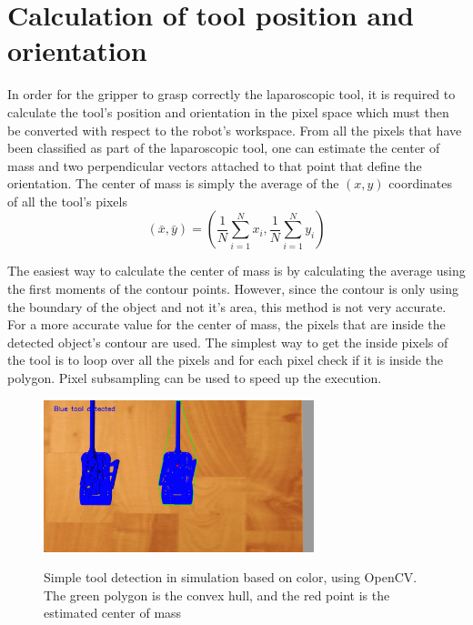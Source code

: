 \section{Calculation of tool position and orientation}

In order for the gripper to grasp correctly the laparoscopic tool, it is required to calculate the tool's position and orientation in the pixel space 
which must then be converted with respect to the robot's workspace. From all the pixels that have been classified as part of the laparoscopic tool,  one can estimate the center of mass and two perpendicular vectors attached to that point that define the orientation. The center of mass is simply the average of the $(x,y)$ coordinates of all the tool's pixels
\begin{equation}
\left( \bar{x}, \bar{y} \right) = \left( \frac{1}{N}\sum_{i=1}^{N} x_i , \frac{1}{N}\sum_{i=1}^{N} y_i \right)
\end{equation}

The easiest way to calculate the center of mass is by calculating the average using the first moments of the contour points. However, since the contour is only using the boundary of the object and not it's area, this method is not very accurate. For a more accurate value for the center of mass, the pixels that are inside the detected object's contour are used. The simplest way to get the inside pixels of the tool is to loop over all the pixels and for each pixel check if it is inside the polygon. Pixel subsampling can be used to speed up the execution.

\begin{center}
\begin{figure}[htbp]
\centering
\includegraphics[width=0.7\textwidth]{images/opencv-tool-convex-hull.png}\\
\caption{Simple tool detection in simulation based on color, using OpenCV. The green polygon is the convex hull, and the red point is the estimated center of mass}
\end{figure}
\end{center}

